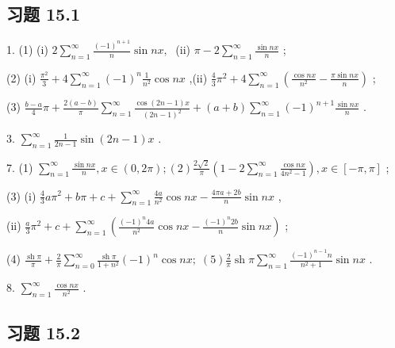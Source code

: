 \subsection{习题 15.1}

1. (1) (i) \(2\mathop{\sum }\limits_{{n = 1}}^{\infty }\frac{{\left( -1\right) }^{n + 1}}{n}\sin {nx},\;\) (ii) \(\pi  - 2\mathop{\sum }\limits_{{n = 1}}^{\infty }\frac{\sin {nx}}{n}\) ;

(2) (i) \(\frac{{\pi }^{2}}{3} + 4\mathop{\sum }\limits_{{n = 1}}^{\infty }{\left( -1\right) }^{n}\frac{1}{{n}^{2}}\cos {nx}\) ,(ii) \(\frac{4}{3}{\pi }^{2} + 4\mathop{\sum }\limits_{{n = 1}}^{\infty }\left( {\frac{\cos {nx}}{{n}^{2}} - \frac{\pi \sin {nx}}{n}}\right)\) ;

(3) \(\frac{b - a}{4}\pi  + \frac{2\left( {a - b}\right) }{\pi }\mathop{\sum }\limits_{{n = 1}}^{\infty }\frac{\cos \left( {{2n} - 1}\right) x}{{\left( 2n - 1\right) }^{2}} + \left( {a + b}\right) \mathop{\sum }\limits_{{n = 1}}^{\infty }{\left( -1\right) }^{n + 1}\frac{\sin {nx}}{n}\) .

3. \(\mathop{\sum }\limits_{{n = 1}}^{\infty }\frac{1}{{2n} - 1}\sin \left( {{2n} - 1}\right) x\) .

7. (1) \(\mathop{\sum }\limits_{{n = 1}}^{\infty }\frac{\sin {nx}}{n},x \in  \left( {0,{2\pi }}\right) ;\left( 2\right) \frac{2\sqrt{2}}{\pi }\left( {1 - 2\mathop{\sum }\limits_{{n = 1}}^{\infty }\frac{\cos {nx}}{4{n}^{2} - 1}}\right) ,x \in  \left\lbrack  {-\pi ,\pi }\right\rbrack\) ;

(3) (i) \(\frac{4}{3}a{\pi }^{2} + {b\pi } + c + \mathop{\sum }\limits_{{n = 1}}^{\infty }\frac{4a}{{n}^{2}}\cos {nx} - \frac{{4\pi a} + {2b}}{n}\sin {nx}\) ,

(ii) \(\frac{a}{3}{\pi }^{2} + c + \mathop{\sum }\limits_{{n = 1}}^{\infty }\left( {\frac{{\left( -1\right) }^{n}{4a}}{{n}^{2}}\cos {nx} - \frac{{\left( -1\right) }^{n}{2b}}{n}\sin {nx}}\right)\) ;

(4) \(\frac{\operatorname{sh}\pi }{\pi } + \frac{2}{\pi }\mathop{\sum }\limits_{{n = 0}}^{\infty }\frac{\operatorname{sh}\pi }{1 + {n}^{2}}{\left( -1\right) }^{n}\cos {nx};\;\left( 5\right) \frac{2}{\pi }\operatorname{sh}\pi \mathop{\sum }\limits_{{n = 1}}^{\infty }\frac{{\left( -1\right) }^{n - 1}n}{{n}^{2} + 1}\sin {nx}\) .

8. \(\mathop{\sum }\limits_{{n = 1}}^{\infty }\frac{\cos {nx}}{{n}^{2}}\) .

\subsection{习题 15.2}

